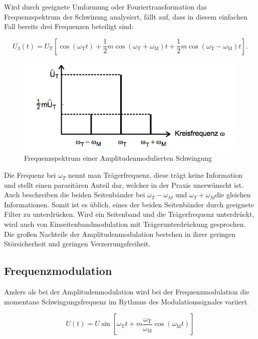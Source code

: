 Wird durch geeignete Umformung oder Fouriertransformation das Frequenzspektrum der Schwinung analysiert, fällt auf, dass in diesem einfachen Fall bereits drei Frequenzen beteiligt sind:

\begin{equation}
U_{3}(t) = U_\text{T} \left[ \cos( \omega_\text{T} t ) + \frac{1}{2} m \cos( \omega_\text{T} + \omega_\text{M} ) t + \frac{1}{2} m \cos( \omega_\text{T} - \omega_\text{M} ) t \right].
\label{eq:FreqAmMod}
\end{equation}

\begin{figure}
	\centering
	\includegraphics[width=\textwidth]{img/Abb2.png}
	\caption{Frequenzspektrum einer Amplitudenmodulierten Schwingung \cite{FP}}
\end{figure}

Die Frequenz bei $\omega_T$ nennt man Trägerfrequenz, diese trägt keine Information und stellt einen parasitären Anteil dar, welcher in der Praxis unerwünscht ist. Auch beschreiben die beiden Seitenbänder bei $\omega_T - \omega_M$ und $\omega_T + \omega_M$die gleichen Informationen. Somit ist es üblich, eines der beiden Seitenbänder durch geeignete Filter zu unterdrücken.
Wird ein Seitenband und die Trägerfrequenz unterdrückt, wird auch von Einseitenbandmodulation mit Trägerunterdrückung gesprochen.
Die großen Nachteile der Amplitudenmodulation bestehen in ihrer geringen Störsicherheit und geringen Verzerrungsfreiheit.

\subsection{Frequenzmodulation}
Anders als bei der Amplitudenmodulation wird bei der Frequenzmodulation die momentane Schwingungsfrequenz im Rythmus des Modulationssignales variiert.

\begin{equation}
U(t)= U \sin \left[\omega_\text{T} t + m \frac{\omega_\text{T}}{\omega_\text{M}} \cos(\omega_\text{M} t)\right]
\label{eq:FreqMod}
\end{equation}

